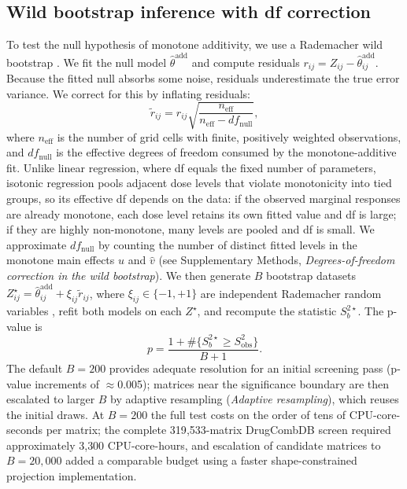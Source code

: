\documentclass[unnumsec,webpdf,contemporary,large]{oup-authoring-template}
\begin{document}
\subsection{Wild bootstrap inference with df correction}
To test the null hypothesis of monotone additivity, we use a Rademacher wild bootstrap \cite{Wu1986}.
We fit the null model $\hat\theta^{\mathrm{add}}$ and compute residuals $r_{ij}=Z_{ij}-\hat\theta^{\mathrm{add}}_{ij}$.
Because the fitted null absorbs some noise, residuals underestimate the true error variance.
We correct for this by inflating residuals:
\begin{equation}
\tilde r_{ij}=r_{ij}\sqrt{\frac{n_{\mathrm{eff}}}{n_{\mathrm{eff}}-df_{\mathrm{null}}}},
\end{equation}
where $n_{\mathrm{eff}}$ is the number of grid cells with finite, positively weighted observations, and $df_{\mathrm{null}}$ is the effective degrees of freedom consumed by the monotone-additive fit.
Unlike linear regression, where df equals the fixed number of parameters, isotonic regression pools adjacent dose levels that violate monotonicity into tied groups, so its effective df depends on the data: if the observed marginal responses are already monotone, each dose level retains its own fitted value and df is large; if they are highly non-monotone, many levels are pooled and df is small.
We approximate $df_{\mathrm{null}}$ by counting the number of distinct fitted levels in the monotone main effects $\hat u$ and $\hat v$ (see Supplementary Methods, \emph{Degrees-of-freedom correction in the wild bootstrap}).
We then generate $B$ bootstrap datasets $Z^\star_{ij}=\hat\theta^{\mathrm{add}}_{ij}+\xi_{ij}\tilde r_{ij}$, where $\xi_{ij}\in\{-1,+1\}$ are independent Rademacher random variables \cite{Wu1986,Mammen1993}, refit both models on each $Z^\star$, and recompute the statistic $S^{2\star}_b$.
The p-value is
\begin{equation}
p=\frac{1+\#\{S^{2\star}_b\ge S^2_{\mathrm{obs}}\}}{B+1}.
\end{equation}
The default $B=200$ provides adequate resolution for an initial screening pass (p-value increments of $\approx$0.005); matrices near the significance boundary are then escalated to larger $B$ by adaptive resampling (\emph{Adaptive resampling}), which reuses the initial draws.
At $B=200$ the full test costs on the order of tens of CPU-core-seconds per matrix; the complete 319{,}533-matrix DrugCombDB screen required approximately 3{,}300 CPU-core-hours, and escalation of candidate matrices to $B=20{,}000$ added a comparable budget using a faster shape-constrained projection implementation.
\end{document}
